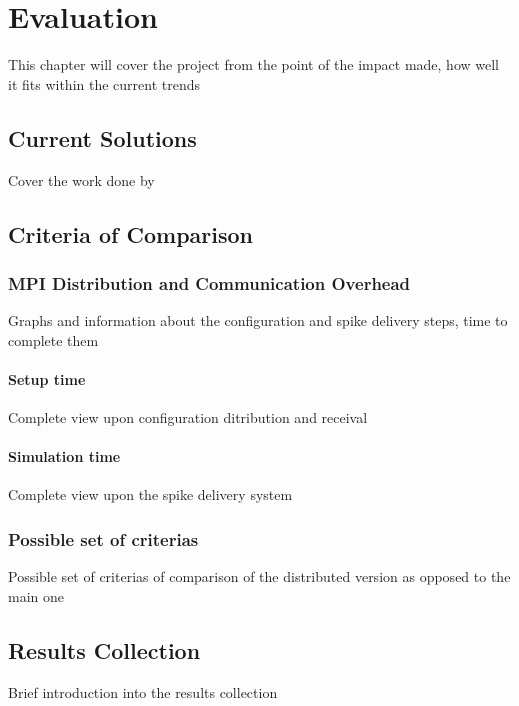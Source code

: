 \chapter{Evaluation}

This chapter will cover the project from the point of the impact made, how well it fits within the current trends

\section{Current Solutions}

Cover the work done by 

\section{Criteria of Comparison}

\subsection{MPI Distribution and Communication Overhead}

Graphs and information about the configuration and spike delivery steps, time to complete them

\subsubsection{Setup time}

Complete view upon configuration ditribution and receival

\subsubsection{Simulation time}

Complete view upon the spike delivery system

\subsection{Possible set of criterias}

Possible set of criterias of comparison of the distributed version as opposed to the main one

\section{Results Collection}

Brief introduction into the results collection


